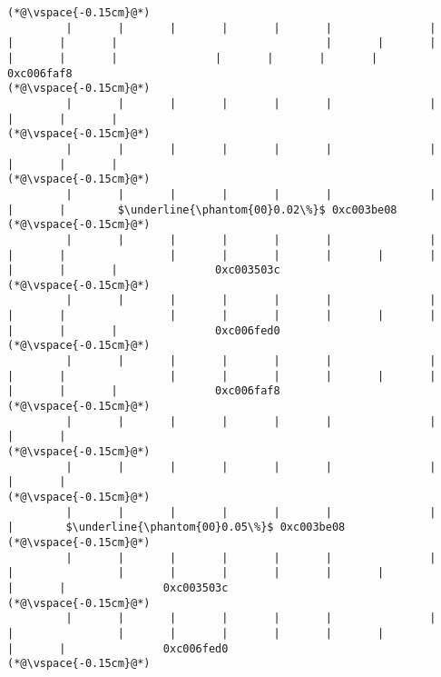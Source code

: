 \begin{lstlisting}[caption=NewDirectByteBuffer, label=profile:C2JNewDirectBuffer-512, numberbychapter=true, frame=lines, float, floatplacement=t]
(*@\vspace{-0.15cm}@*)
         |       |       |       |       |       |               |       |       |       |                                |       |       |       |       |       |               |       |       |       |                               0xc006faf8
(*@\vspace{-0.15cm}@*)
         |       |       |       |       |       |               |       |       |       |
(*@\vspace{-0.15cm}@*)
         |       |       |       |       |       |               |       |       |       |
(*@\vspace{-0.15cm}@*)
         |       |       |       |       |       |               |       |       |        $\underline{\phantom{00}0.02\%}$ 0xc003be08
(*@\vspace{-0.15cm}@*)
         |       |       |       |       |       |               |       |       |                |       |       |       |       |       |               |       |       |               0xc003503c
(*@\vspace{-0.15cm}@*)
         |       |       |       |       |       |               |       |       |                |       |       |       |       |       |               |       |       |               0xc006fed0
(*@\vspace{-0.15cm}@*)
         |       |       |       |       |       |               |       |       |                |       |       |       |       |       |               |       |       |               0xc006faf8
(*@\vspace{-0.15cm}@*)
         |       |       |       |       |       |               |       |       |
(*@\vspace{-0.15cm}@*)
         |       |       |       |       |       |               |       |       |
(*@\vspace{-0.15cm}@*)
         |       |       |       |       |       |               |       |        $\underline{\phantom{00}0.05\%}$ 0xc003be08
(*@\vspace{-0.15cm}@*)
         |       |       |       |       |       |               |       |                |       |       |       |       |       |               |       |               0xc003503c
(*@\vspace{-0.15cm}@*)
         |       |       |       |       |       |               |       |                |       |       |       |       |       |               |       |               0xc006fed0
(*@\vspace{-0.15cm}@*)

\end{lstlisting}

